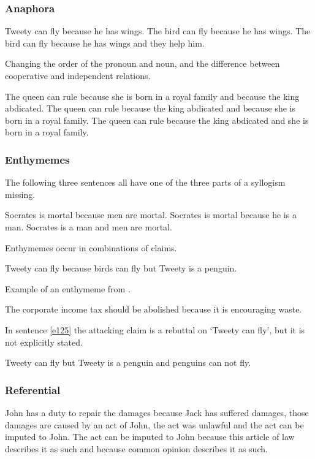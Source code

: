 \subsubsection{Anaphora}
\begin{exe}
\ex\label{e59} Tweety can fly because he has wings.
\ex\label{e60} The bird can fly because he has wings.
\ex\label{e61} The bird can fly because he has wings and they help him.
\end{exe}

\noindent Changing the order of the pronoun and noun, and the difference between cooperative and independent relations.
\begin{exe}
\ex\label{e62} The queen can rule because she is born in a royal family and because the king abdicated.
\ex\label{e63} The queen can rule because the king abdicated and because she is born in a royal family.
\ex\label{e71} The queen can rule because the king abdicated and she is born in a royal family.
\end{exe}

\subsubsection{Enthymemes}
The following three sentences all have one of the three parts of a syllogism missing.
\begin{exe}
\ex\label{e120} Socrates is mortal because men are mortal.
\ex\label{e121} Socrates is mortal because he is a man.
\ex\label{e122} Socrates is a man and men are mortal.
\end{exe}

\noindent Enthymemes occur in combinations of claims.
\begin{exe}
\ex\label{e123} Tweety can fly because birds can fly but Tweety is a penguin.
\end{exe}

\noindent Example of an enthymeme from \citet{Walton:2005dc}.
\begin{exe}
\ex\label{e124} The corporate income tax should be abolished because it is encouraging waste.
\end{exe}

\noindent In sentence \ref{e125} the attacking claim is a rebuttal on `Tweety can fly', but it is not explicitly stated.
\begin{exe}
\ex\label{e125} Tweety can fly but Tweety is a penguin and penguins can not fly.
\end{exe}

\subsubsection{Referential}
\begin{exe}
\ex\label{e126} John has a duty to repair the damages because Jack has suffered damages, those damages are caused by an act of John, the act was unlawful and the act can be imputed to John. The act can be imputed to John because this article of law describes it as such and because common opinion describes it as such.
\end{exe}

\clearpage